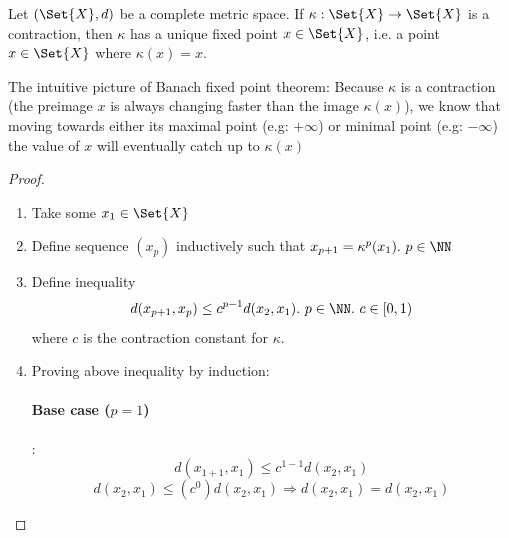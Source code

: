 \begin{thm}
  Let $(\Set{X}, d)$ be a complete metric space. If $\kappa: \Set{X} \rightarrow \Set{X}$ is a contraction, then $\kappa$ has a unique fixed point $x \in \Set{X}$, i.e. a point $x \in \Set{X}$ where $\kappa(x) = x$.
\end{thm}

\begin{rem}
  The intuitive picture of Banach fixed point theorem: Because $\kappa$ is a contraction (the preimage $x$ is always changing faster than the image $\kappa(x)$), we know that moving towards either its maximal point (e.g: $+\infty$) or minimal point (e.g: $-\infty$) the value of $x$ will eventually catch up to $\kappa(x)$
\end{rem}

\begin{proof}\ 
  \begin{enumerate}
  \item Take some $x_1 \in \Set{X}$
  \item Define sequence $(x_p)$ inductively such that $x_{p+1} = \kappa^p(x_1).\ p \in \NN$
  \item Define inequality
    \begin{equation}
      \label{l8e0}
      d(x_{p+1}, x_p) \leq c^{p-1}d(x_2, x_1).\ p \in \NN.\ c \in [0, 1)
    \end{equation}
    where $c$ is the contraction constant for $\kappa$. 
  \item Proving above inequality by induction:
    \paragraph{Base case ($p=1$)}:
    $$d(x_{1+1}, x_1) \leq c^{1-1}d(x_2, x_1)$$
    $$d(x_2, x_1) \leq (c^0)d(x_2, x_1) \Rightarrow d(x_2, x_1) = d(x_2, x_1)$$

\end{enumerate}
\end{proof}

